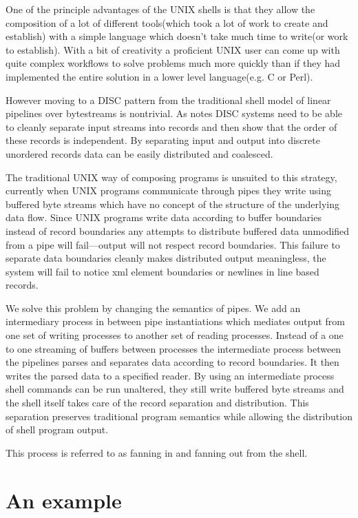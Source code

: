 \documentclass[10pt,conference,letterpaper]{IEEEtran}
\begin{document}
One of the principle advantages of the UNIX shells is that they allow the composition of a lot of different tools(which took a lot of work to create and establish) with a simple language which doesn't take much time to write(or work to establish). With a bit of creativity a proficient UNIX user can come up with quite complex workflows to solve problems much more quickly than if they had implemented the entire solution in a lower level language(e.g. C or Perl). 

However moving to a DISC pattern from the traditional shell model of linear pipelines over bytestreams is nontrivial. 
As \cite{pike2005idp} notes DISC systems need to be able to cleanly separate input streams into records and then show that the order of these records is independent. By separating input and output into discrete unordered records data can be easily distributed and coalesced.

The traditional UNIX way of composing programs is unsuited to this strategy, currently when UNIX programs communicate through pipes they write using buffered byte streams which have no concept of the structure of the underlying data flow. Since UNIX programs write data according to buffer boundaries instead of record boundaries any attempts to distribute buffered data unmodified from a pipe will fail---output will not respect record boundaries. This failure to separate data boundaries cleanly makes distributed output meaningless, the system will fail to notice xml element boundaries or newlines in line based records. 

We solve this problem by changing the semantics of pipes.  We add an intermediary process in between pipe instantiations which mediates output from one set of writing processes to another set of reading processes. Instead of a one to one streaming of buffers between processes the intermediate process between the pipelines parses and separates data according to record boundaries. It then writes the parsed data to a specified reader. By using an intermediate process shell commands can be run unaltered, they still write buffered byte streams and the shell itself takes care of the record separation and distribution. This separation preserves traditional program semantics while allowing the distribution of shell program output.

This process is referred to as fanning in and fanning out from the shell.    
\section{An example}
\end{document}
